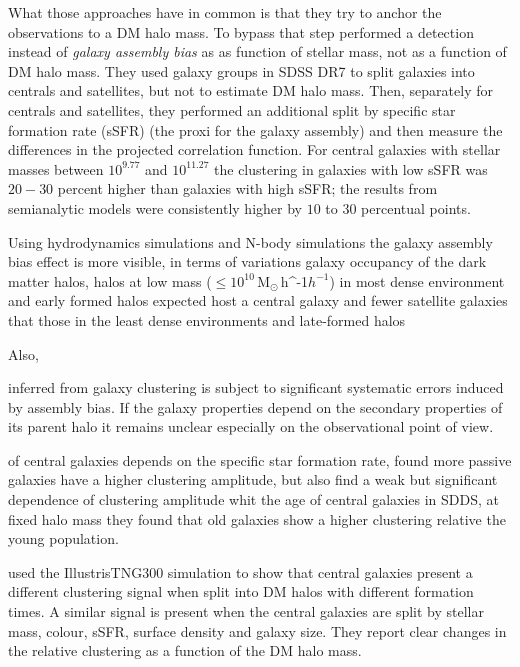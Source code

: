 \documentclass[fleqn,usenatbib]{mnras}
\newcommand{\Msunh}{\,{\rm M}$_{\odot}$\,\ifmmode h^{-1}\else $h^{-1}$\fi}
\begin{document}
What those approaches have in common is that they try to anchor the
observations to a DM halo mass. 
To bypass that step \citet{2013MNRAS.433..515W} performed a detection
instead of \emph{galaxy assembly bias} as as function of stellar mass, not as
a function of DM halo mass. 
They used galaxy groups in SDSS DR7 to split galaxies into centrals
and satellites, but not to estimate DM halo mass. 
Then, separately for centrals and satellites, they performed an additional
split by specific star formation rate (sSFR) (the proxi for the galaxy
assembly) and then measure the differences in the projected correlation function.
For central galaxies with stellar masses between $10^{9.77}$ and $10^{11.27}$
the clustering in galaxies with low sSFR was $20-30$ percent higher
than galaxies with high sSFR; the results from semianalytic models
were consistently higher by $10$ to $30$ percentual points.


Using hydrodynamics simulations and
N-body simulations the galaxy assembly bias effect is more visible, in
terms of variations galaxy occupancy of the dark matter halos, halos
at low mass ($\leq 10^{10}$\Msunh) in most dense environment and early
formed halos expected host a central galaxy and fewer satellite
galaxies that those in the least dense environments and late-formed
halos \citep{2018MNRAS.480.3978A} 

Also, 

inferred from galaxy clustering is subject to significant systematic
errors induced by assembly bias. If the galaxy properties depend on
the secondary properties of its parent halo it remains unclear
especially on the observational point of view.   




of central galaxies depends on the specific star formation rate, found
more passive galaxies have a higher clustering amplitude, but
\citet{Lacerna_2014} also find a weak but significant dependence of
clustering amplitude whit the age of central galaxies in SDDS, at
fixed halo mass they found that old galaxies show a higher clustering
relative the young population.



\cite{2020MNRAS.tmp.1844M} used the IllustrisTNG300 simulation to show
that central galaxies present a different clustering signal when split
into DM halos with different formation times. 
A similar signal is present when the central galaxies are split by
stellar mass, colour, sSFR, surface density
and galaxy size. 
They report clear changes in the relative clustering as a function of
the DM halo mass.
\end{document}
